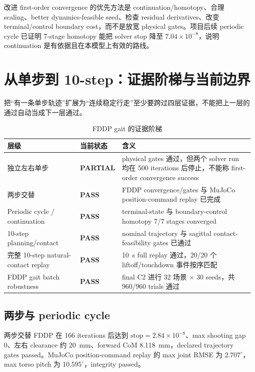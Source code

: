 \documentclass[UTF8,11pt,a4paper]{ctexart}
\newcommand{\pass}{\textcolor{green!45!black}{\textbf{PASS}}}
\newcommand{\partialstatus}{\textcolor{orange!75!black}{\textbf{PARTIAL}}}
\begin{document}
改进 first-order convergence 的优先方法是 continuation/homotopy、合理 scaling、better dynamics-feasible seed、检查 residual derivatives、改变 terminal/control boundary cost，而不是放宽 physical gates。项目后续 periodic cycle 已证明 7-stage homotopy 能把 solver stop 降至 $7.04\times10^{-8}$，说明 continuation 是有依据且在本模型上有效的路线。

\section{从单步到 10-step：证据阶梯与当前边界}\label{sec:multistep}

把“有一条单步轨迹”扩展为“连续稳定行走”至少要跨过四层证据，不能把上一层的通过自动当成下一层通过。

\begin{table}[htbp]
\centering
\caption{FDDP gait 的证据阶梯}
\begin{tabularx}{\linewidth}{@{}p{2.8cm}p{2.2cm}X@{}}
\toprule
层级 & 当前状态 & 含义 \\
\midrule
独立左右单步 & \partialstatus & physical gates 通过，但两个 solver run 均在 500 iterations 后停止，不能称 first-order convergence success \\
两步交替 & \pass & FDDP convergence/gates 与 MuJoCo position-command replay 已完成 \\
Periodic cycle / continuation & \pass & terminal-state 与 boundary-control homotopy 7/7 stages converged \\
10-step planning/contact & \pass & nominal trajectory 与 sagittal contact-feasibility gates 已通过 \\
完整 10-step natural-contact replay & \pass & \SI{10}{s} full replay 通过，20/20 个 liftoff/touchdown 事件按序匹配 \\
FDDP gait batch robustness & \pass & final C2 进行 32 场景 $\times$ 30 seeds，共 960/960 trials 通过 \\
\bottomrule
\end{tabularx}
\end{table}

\subsection{两步与 periodic cycle}

两步交替 FDDP 在 166 iterations 后达到 $\mathrm{stop}=2.84\times10^{-8}$、max shooting gap 0、左右 clearance 约 \SI{20}{mm}、forward CoM \SI{8.118}{mm}，declared trajectory gates passed。MuJoCo position-command replay 的 max joint RMSE 为 $2.707^\circ$，max torso pitch 为 $10.595^\circ$，integrity passed。
\end{document}

